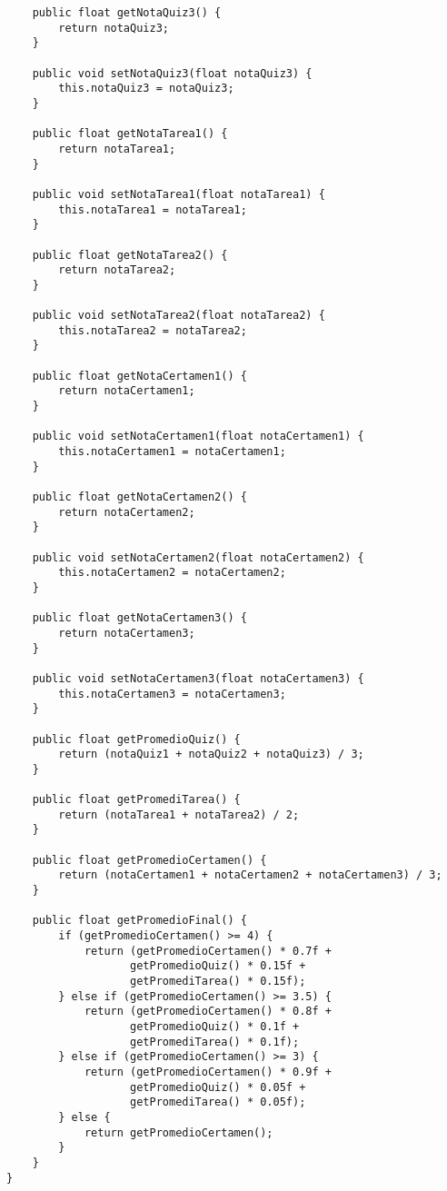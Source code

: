 \documentclass[10pt]{article}
\begin{document}
\begin{verbatim}
    public float getNotaQuiz3() {
        return notaQuiz3;
    }

    public void setNotaQuiz3(float notaQuiz3) {
        this.notaQuiz3 = notaQuiz3;
    }

    public float getNotaTarea1() {
        return notaTarea1;
    }

    public void setNotaTarea1(float notaTarea1) {
        this.notaTarea1 = notaTarea1;
    }

    public float getNotaTarea2() {
        return notaTarea2;
    }

    public void setNotaTarea2(float notaTarea2) {
        this.notaTarea2 = notaTarea2;
    }

    public float getNotaCertamen1() {
        return notaCertamen1;
    }

    public void setNotaCertamen1(float notaCertamen1) {
        this.notaCertamen1 = notaCertamen1;
    }

    public float getNotaCertamen2() {
        return notaCertamen2;
    }

    public void setNotaCertamen2(float notaCertamen2) {
        this.notaCertamen2 = notaCertamen2;
    }

    public float getNotaCertamen3() {
        return notaCertamen3;
    }

    public void setNotaCertamen3(float notaCertamen3) {
        this.notaCertamen3 = notaCertamen3;
    }

    public float getPromedioQuiz() {
        return (notaQuiz1 + notaQuiz2 + notaQuiz3) / 3;
    }

    public float getPromediTarea() {
        return (notaTarea1 + notaTarea2) / 2;
    }

    public float getPromedioCertamen() {
        return (notaCertamen1 + notaCertamen2 + notaCertamen3) / 3;
    }

    public float getPromedioFinal() {
        if (getPromedioCertamen() >= 4) {
            return (getPromedioCertamen() * 0.7f + 
                   getPromedioQuiz() * 0.15f + 
                   getPromediTarea() * 0.15f);
        } else if (getPromedioCertamen() >= 3.5) {
            return (getPromedioCertamen() * 0.8f + 
                   getPromedioQuiz() * 0.1f + 
                   getPromediTarea() * 0.1f);
        } else if (getPromedioCertamen() >= 3) {
            return (getPromedioCertamen() * 0.9f + 
                   getPromedioQuiz() * 0.05f + 
                   getPromediTarea() * 0.05f);
        } else {
            return getPromedioCertamen();
        }
    }
}


\end{verbatim}
\end{document}
